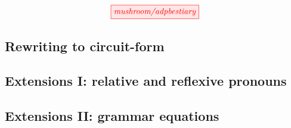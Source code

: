 \begin{fullwidth}
\[
\tikzfig{mushroom/adpbestiary}
\]

\subsection{Rewriting to circuit-form}



\begin{example}

\end{example}

\subsection{Extensions I: relative and reflexive pronouns}


\begin{example}

\end{example}


\begin{example}

\end{example}


\begin{example}

\end{example}

\subsection{Extensions II: grammar equations}


\begin{example}

\end{example}


\begin{example}

\end{example}


\begin{example}


\end{example}
\end{fullwidth}
